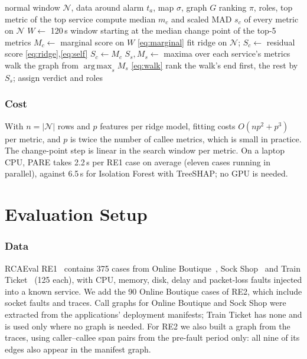 \documentclass[conference]{IEEEtran}
\DeclareMathOperator*{\argmax}{arg\,max}
\newcommand{\Ccal}{\mathcal{C}}
\newcommand{\Ncal}{\mathcal{N}}
\begin{document}
\begin{algorithm}[t]
\caption{PARE}
\label{alg:pare}
\begin{algorithmic}[1]
\REQUIRE normal window $\Ncal$, data around alarm $t_a$, map $\sigma$, graph $G$
\ENSURE ranking $\pi$, roles, top metric of the top service
\STATE compute median $m_c$ and scaled MAD $s_c$ of every metric on $\Ncal$
\STATE $W\gets$ 120\,s window starting at the median change point of the top-5 metrics
  \STATE $M_c\gets$ marginal score on $W$ \hfill\eqref{eq:marginal}
  \IF{$\Ccal(\sigma(c))\neq\emptyset$}
    \STATE fit ridge on $\Ncal$; $S_c\gets$ residual score \hfill\eqref{eq:ridge},\eqref{eq:self}
  \ELSE
    \STATE $S_c\gets M_c$
  \ENDIF
\ENDFOR
\STATE $S_s,M_s\gets$ maxima over each service's metrics
\STATE walk the graph from $\argmax_s M_s$ \hfill\eqref{eq:walk}
\STATE rank the walk's end first, the rest by $S_s$; assign verdict and roles
\end{algorithmic}
\end{algorithm}

\subsubsection{Cost}
With $n=|\Ncal|$ rows and $p$ features per ridge model, fitting costs
$O(np^2+p^3)$ per metric, and $p$ is twice the number of callee metrics, which is
small in practice. The change-point step is linear in the search window per metric.
On a laptop CPU, PARE takes 2.2\,s per RE1 case on average (eleven cases running in
parallel), against 6.5\,s for Isolation Forest with TreeSHAP; no GPU is needed.

\section{Evaluation Setup}\label{sec:setup}

\subsubsection{Data}
RCAEval RE1~\cite{pham2025rcaeval} contains 375 cases from Online
Boutique~\cite{onlineboutique}, Sock Shop~\cite{sockshop} and Train
Ticket~\cite{zhou2021trainticket} (125 each), with CPU, memory, disk, delay and
packet-loss faults injected into a known service. We add the 90 Online Boutique
cases of RE2, which include socket faults and traces. Call graphs for Online
Boutique and Sock Shop were extracted from the applications' deployment manifests;
Train Ticket has none and is used only where no graph is needed. For RE2 we also
built a graph from the traces, using caller--callee span pairs from the pre-fault
period only: all nine of its edges also appear in the manifest graph.
\end{document}
